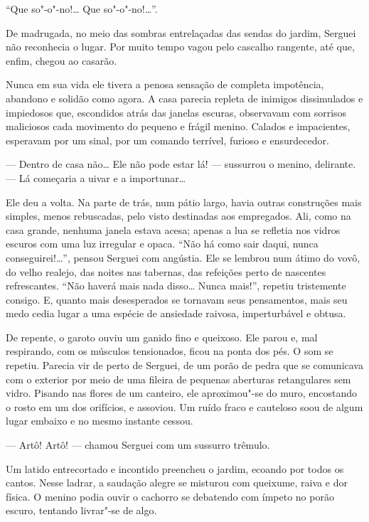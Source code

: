 ``Que so"-o"-no!\ldots{} Que so"-o"-no!\ldots{}''.

De madrugada, no meio das sombras entrelaçadas das sendas do jardim,
Serguei não reconhecia o lugar. Por muito tempo vagou pelo cascalho
rangente, até que, enfim, chegou ao casarão.

Nunca em sua vida ele tivera a penosa sensação de completa impotência,
abandono e solidão como agora. A casa parecia repleta de inimigos
dissimulados e impiedosos que, escondidos atrás das janelas escuras,
observavam com sorrisos maliciosos cada movimento do pequeno e frágil
menino. Calados e impacientes, esperavam por um sinal, por um comando
terrível, furioso e ensurdecedor.

--- Dentro de casa não\ldots{} Ele não pode estar lá! --- sussurrou o
menino, delirante. --- Lá começaria a uivar e a importunar\ldots{}

Ele deu a volta. Na parte de trás, num pátio largo, havia outras
construções mais simples, menos rebuscadas, pelo visto destinadas aos
empregados. Ali, como na casa grande, nenhuma janela estava acesa;
apenas a lua se refletia nos vidros escuros com uma luz irregular e
opaca. ``Não há como sair daqui, nunca conseguirei!\ldots{}'', pensou Serguei
com angústia. Ele se lembrou num átimo do vovô, do velho realejo, das
noites nas tabernas, das refeições perto de nascentes refrescantes.
``Não haverá mais nada disso\ldots{} Nunca mais!'', repetiu tristemente
consigo. E, quanto mais desesperados se tornavam seus pensamentos, mais
seu medo cedia lugar a uma espécie de ansiedade raivosa,
imperturbável e obtusa.

De repente, o garoto ouviu um ganido fino e queixoso. Ele parou e, mal
respirando, com os músculos tensionados, ficou na ponta dos pés. O som
se repetiu. Parecia vir de perto de Serguei, de um porão de pedra que se
comunicava com o exterior por meio de uma fileira de pequenas aberturas
retangulares sem vidro. Pisando nas flores de um canteiro, ele
aproximou"-se do muro, encostando o rosto em um dos orifícios, e
assoviou. Um ruído fraco e cauteloso soou de algum lugar embaixo e no
mesmo instante cessou.

--- Artô! Artô! --- chamou Serguei com um sussurro trêmulo.

Um latido entrecortado e incontido preencheu o jardim, ecoando por todos
os cantos. Nesse ladrar, a saudação alegre se misturou com queixume, raiva
e dor física. O menino podia ouvir o cachorro se debatendo com ímpeto no
porão escuro, tentando livrar"-se de algo.


